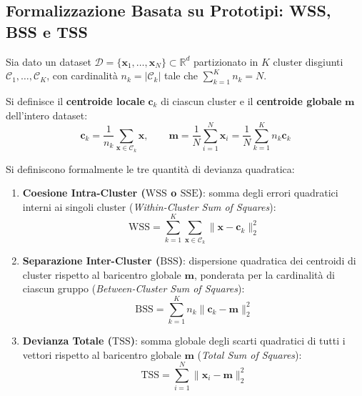 \FloatBarrier
\subsection{Formalizzazione Basata su Prototipi: WSS, BSS e TSS}
Sia dato un dataset $\mathcal{D} = \{\mathbf{x}_1, \dots, \mathbf{x}_N\} \subset \mathbb{R}^d$ partizionato in $K$ cluster disgiunti $\mathcal{C}_1, \dots, \mathcal{C}_K$, con cardinalità $n_k = |\mathcal{C}_k|$ tale che $\sum_{k=1}^K n_k = N$.

Si definisce il \textbf{centroide locale} $\mathbf{c}_k$ di ciascun cluster e il \textbf{centroide globale} $\mathbf{m}$ dell'intero dataset:
\begin{equation}
\label{eq:dm-centroids-definitions}
\mathbf{c}_k = \frac{1}{n_k} \sum_{\mathbf{x} \in \mathcal{C}_k} \mathbf{x}, \qquad \mathbf{m} = \frac{1}{N} \sum_{i=1}^N \mathbf{x}_i = \frac{1}{N} \sum_{k=1}^K n_k \mathbf{c}_k
\end{equation}

Si definiscono formalmente le tre quantità di devianza quadratica:
\begin{enumerate}
    \item \textbf{Coesione Intra-Cluster ($\mathrm{WSS}$ o $\mathrm{SSE}$)}: somma degli errori quadratici interni ai singoli cluster (\textit{Within-Cluster Sum of Squares}):
    \begin{equation}
    \label{eq:dm-wss-definition}
    \mathrm{WSS} = \sum_{k=1}^K \sum_{\mathbf{x} \in \mathcal{C}_k} \|\mathbf{x} - \mathbf{c}_k\|_2^2
    \end{equation}
    
    \item \textbf{Separazione Inter-Cluster ($\mathrm{BSS}$)}: dispersione quadratica dei centroidi di cluster rispetto al baricentro globale $\mathbf{m}$, ponderata per la cardinalità di ciascun gruppo (\textit{Between-Cluster Sum of Squares}):
    \begin{equation}
    \label{eq:dm-bss-definition}
    \mathrm{BSS} = \sum_{k=1}^K n_k \|\mathbf{c}_k - \mathbf{m}\|_2^2
    \end{equation}
    
    \item \textbf{Devianza Totale ($\mathrm{TSS}$)}: somma globale degli scarti quadratici di tutti i vettori rispetto al baricentro globale $\mathbf{m}$ (\textit{Total Sum of Squares}):
    \begin{equation}
    \label{eq:dm-tss-definition}
    \mathrm{TSS} = \sum_{i=1}^N \|\mathbf{x}_i - \mathbf{m}\|_2^2
    \end{equation}
\end{enumerate}

